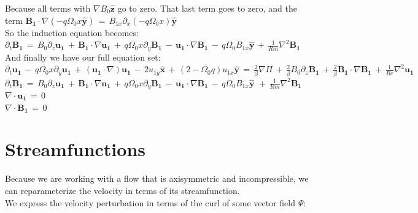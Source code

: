 \documentclass[letterpaper,12pt]{article}
\newcommand\reye{\mathrel{Re}}
\newcommand\reym{\mathrel{Rm}}
\begin{document}
Because all terms with $\nabla B_0 \mathbf{\hat{z}}$ go to zero. That last term goes to zero, and the term $\mathbf{B_1}\cdot \nabla\left(-q\Omega_0x \mathbf{\hat{y}}\right) \, = \, B_{1x} \partial_x\left(-q \Omega_0 x \right) \mathbf{\hat{y}}$ \\

So the induction equation becomes: \\

$\partial_t \mathbf{B_1} \, = \, B_0 \partial_z \mathbf{u_1} \, + \, \mathbf{B_1} \cdot \nabla \mathbf{u_1} \, + \, q \Omega_0 x \partial_y \mathbf{B_1} \, - \, \mathbf{u_1} \cdot \nabla \mathbf{B_1} \, - \, q\Omega_0 B_{1x} \mathbf{\hat{y}} \,+ \, \frac{1}{\reym} \nabla^2 \mathbf{B_1} $ \\

And finally we have our full equation set: \\

$\partial_t \mathbf{u_1} \, - \, q\Omega_0 x \partial_y \mathbf{u_1} \, + \, \left(\mathbf{u_1}\cdot \nabla\right) \mathbf{u_1} \, - \, 2 u_{1y} \mathbf{\hat{x}} \, + \, \left(2 - \Omega_0 q\right)u_{1x}\mathbf{\hat{y}} \, = \, \frac{2}{\beta} \nabla \Pi \, + \, \frac{2}{\beta}B_0\partial_z\mathbf{B_1} \, + \, \frac{2}{\beta}\mathbf{B_1} \cdot \nabla \mathbf{B_1}\,  + \, \frac{1}{\reye}\nabla^2 \mathbf{u_1}$ \\

$\partial_t \mathbf{B_1} \, = \, B_0 \partial_z \mathbf{u_1} \, + \, \mathbf{B_1} \cdot \nabla \mathbf{u_1} \, + \, q \Omega_0 x \partial_y \mathbf{B_1} \, - \, \mathbf{u_1} \cdot \nabla \mathbf{B_1} \, - \, q\Omega_0 B_{1x} \mathbf{\hat{y}} \,\, + \, \frac{1}{\reym} \nabla^2 \mathbf{B_1} $ \\

$\nabla \cdot \mathbf{u_1} \, = \, 0$\\

$\nabla \cdot \mathbf{B_1} \, = \, 0$ \\ 

\section*{Streamfunctions}

Because we are working with a flow that is axisymmetric and incompressible, we can reparameterize the velocity in terms of its streamfunction. \\

We express the velocity perturbation in terms of the curl of some vector field $\Psi$: \\
 
\end{document}
